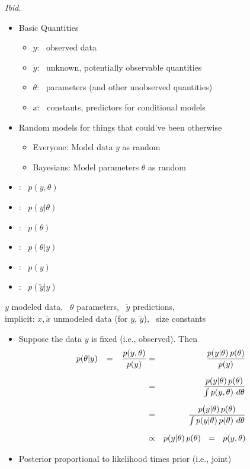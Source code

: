 \documentclass[10pt]{report}
\newcommand{\sld}[1]{\newpage{\noindent\LARGE \ \ \
    \textcolor{MidnightBlue}{\bfseries #1}}\vspace*{4pt}}
\newcommand{\spc}{\hspace*{0.25in}}
\newcommand{\myemph}[1]{{\color{MidnightBlue}{\bfseries #1}}}
\begin{document}
\vfill\hfill {\footnotesize {\slshape Ibid.}}

\sld{Basic Quantities}
%
\begin{itemize}
\item Basic Quantities
\vspace*{-4pt}
\begin{itemize}
\item $y$: \ observed data
\item $\tilde{y}$: \ unknown, potentially observable quantities
\item $\theta$: \ parameters (and other unobserved quantities)
\item $x$: \ constants, predictors for conditional models
\end{itemize}
\item Random models for things that could've been otherwise
\begin{itemize}
\item Everyone: Model data $y$ as random
\item Bayesians:  Model parameters $\theta$ as random
\end{itemize}
\end{itemize}


\sld{Distribution Naming Conventions}

\begin{itemize}
\item \myemph{Joint}: \ $p(y,\theta)$
\item \myemph{Sampling / Likelihood}: \ $p(y|\theta)$
\item \myemph{Prior}: \ $p(\theta)$
\item \myemph{Posterior}: \ $p(\theta|y)$
\item \myemph{Data Marginal}: \ $p(y)$
\item \myemph{Posterior Predictive}: \ $p(\tilde{y}|y)$
\end{itemize}

\noindent
\spc
{\footnotesize $y$ modeled data, \, $\theta$ parameters, \, $\tilde{y}$ predictions,}
\\[4pt]
\spc
{\footnotesize implicit: $x, \tilde{x}$ unmodeled data (for $y$, $\tilde{y}$), \ size constants}

\sld{Bayes's Rule for the Posterior}
%
\begin{itemize}
\item Suppose the data $y$ is fixed (i.e., observed).  Then
%
\vspace*{2pt}
\begin{eqnarray*}
p(\theta|y) 
 \hspace*{8pt} = \hspace*{8pt} \frac{p(y,\theta)}{p(y)}
& = & \frac{p(y|\theta) \, p(\theta)}{p(y)}
\\[6pt]
& = & \frac{p(y|\theta) \, p(\theta)}{\int p(y,\theta) \ d\theta}
\\[6pt]
& = & \frac{p(y|\theta) \, p(\theta)}{\int p(y|\theta) \, p(\theta) \ d\theta}
\\[6pt]
& \propto & p(y|\theta) \, p(\theta) \ \ = \ \ p(y,\theta)
\end{eqnarray*}
\item Posterior proportional to likelihood times prior (i.e., joint)
\end{itemize}
\end{document}
